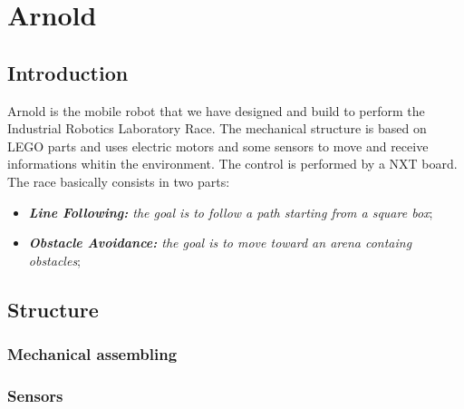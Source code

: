 \documentclass[a4paper,11pt,oneside]{book}
\begin{document}
\newpage
\thispagestyle{empty}



\tableofcontents \thispagestyle{empty}
\listoffigures\thispagestyle{empty}



\chapter{Arnold}

\section*{Introduction}

Arnold is the mobile robot that we have designed and build to perform the Industrial Robotics Laboratory Race. The mechanical structure is based on LEGO parts and uses electric motors and some sensors to move and receive informations whitin the environment. The control is performed by a NXT board. The race basically consists in two parts:
\begin{itemize}
	\item \textit{ \textbf {Line Following:} the goal is to follow a path starting from a square box};
	\item \textit{\textbf {Obstacle Avoidance:} the goal is to move toward an arena containg obstacles};

\end{itemize}
\section{Structure}
\subsection {Mechanical assembling}
\subsection {Sensors}
\end{document}
